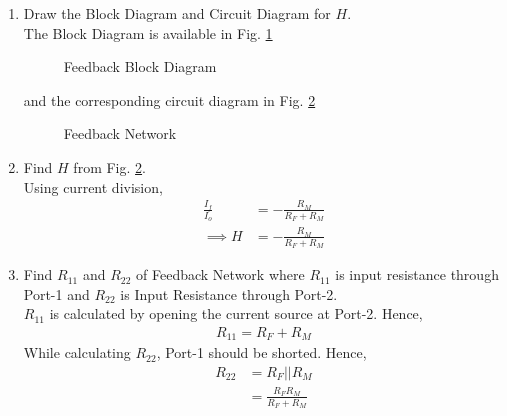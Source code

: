 \begin{enumerate}[label=\thesubsection.\arabic*.,ref=\thesubsection.\theenumi]

\item Draw the Block Diagram and Circuit Diagram for $H$.\\
\solution The Block Diagram  is available in Fig. 	\ref{fig:ee18btech11014_Feedback_Block}

\renewcommand{\thefigure}{\theenumi.\arabic{figure}}
\begin{figure}[ht!]
	\begin{center}
		\resizebox{\columnwidth}{!}{}
	\end{center}
	\caption{Feedback Block Diagram}
	\label{fig:ee18btech11014_Feedback_Block}
\end{figure}
and the corresponding circuit diagram in Fig.  \ref{fig:ee18btech11014_Feedback_Network}
\begin{figure}[ht!]
	\begin{center}
		\resizebox{\columnwidth/2}{!}{}
	\end{center}
	\caption{Feedback Network}
	\label{fig:ee18btech11014_Feedback_Network}
\end{figure}
\renewcommand{\thefigure}{\theenumi}
\item Find $H$ from Fig.  \ref{fig:ee18btech11014_Feedback_Network}.
\\
\solution Using current division,
\begin{align}
\frac{I_{f}}{I_{o}} &= -\frac{R_{M}}{R_{F}+R_{M}}
\\
\implies H &= -\frac{R_{M}}{R_{F}+R_{M}}
\end{align}


\item Find $R_{11}$ and $R_{22}$  of Feedback Network where $R_{11}$ is input resistance through Port-1 and $R_{22}$ is Input Resistance through Port-2.\\
\solution $R_{11}$ is calculated by opening the current source at  Port-2.  Hence, 
\begin{align}
R_{11} = R_{F} + R_{M}
\end{align}
While calculating $R_{22}$, Port-1 should be shorted. Hence, 
\begin{align}
R_{22} &= R_{F} || R_{M}\\
 &= \frac{R_{F}R_{M}}{R_{F}+R_{M}}
\end{align}


\end{enumerate}
